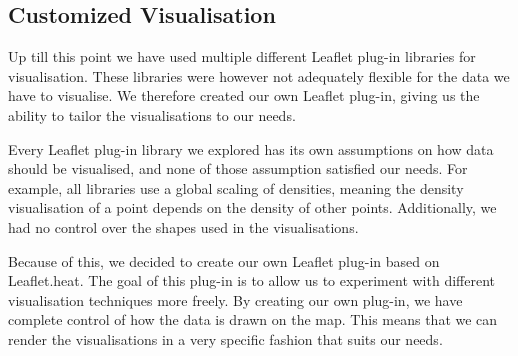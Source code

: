 \subsection{Customized Visualisation}\label{sec:own_leaflet_plugin}

Up till this point we have used multiple different Leaflet plug-in libraries for visualisation. These libraries were however not adequately flexible for the data we have to visualise. We therefore created our own Leaflet plug-in, giving us the ability to tailor the visualisations to our needs.

Every Leaflet plug-in library we explored has its own assumptions on how data should be visualised, and none of those assumption satisfied our needs. For example, all libraries use a global scaling of densities, meaning the density visualisation of a point depends on the density of other points. Additionally, we had no control over the shapes used in the visualisations.

Because of this, we decided to create our own Leaflet plug-in based on Leaflet.heat. The goal of this plug-in is to allow us to experiment with different visualisation techniques more freely. By creating our own plug-in, we have complete control of how the data is drawn on the map. This means that we can render the visualisations in a very specific fashion that suits our needs.